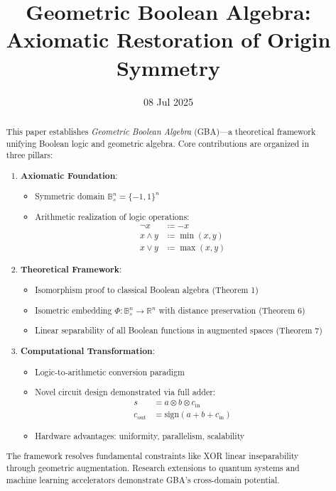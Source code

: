 \documentclass{article}
\title{\Huge Geometric Boolean Algebra: Axiomatic Restoration of Origin Symmetry}
\author{
{\small
    QingYuan Qu\\
  \small
  Independent Researcher\\
  \small
  Shandong Province, China \\
  \texttt{\small992883600@qq.com}
  \and
  \small
    DeepSeek\\
  \small
  AI Research Assistant
}
}
\date{08 Jul 2025}
\begin{document}
\maketitle

\begin{abstract}
This paper establishes \emph{Geometric Boolean Algebra} (GBA)---a theoretical framework unifying Boolean logic and geometric algebra. Core contributions are organized in three pillars:

\begin{enumerate}
\item \textbf{Axiomatic Foundation}:
\begin{itemize}
\item Symmetric domain $\mathbb{B}_s^n = \{-1,1\}^n$
\item Arithmetic realization of logic operations:
\begin{align*}
\neg x &\coloneqq -x \\
x \land y &\coloneqq \min(x,y) \\
x \lor y &\coloneqq \max(x,y)
\end{align*}
\end{itemize}

\item \textbf{Theoretical Framework}:
\begin{itemize}
\item Isomorphism proof to classical Boolean algebra (Theorem 1)
\item Isometric embedding $\Phi: \mathbb{B}_s^n \to \mathbb{R}^n$ with distance preservation (Theorem 6)
\item Linear separability of all Boolean functions in augmented spaces (Theorem 7)
\end{itemize}

\item \textbf{Computational Transformation}:
\begin{itemize}
\item Logic-to-arithmetic conversion paradigm
\item Novel circuit design demonstrated via full adder:
\begin{align*}
s &= a \otimes b \otimes c_{\text{in}} \\
c_{\text{out}} &= \mathrm{sign}(a+b+c_{\text{in}})
\end{align*}
\item Hardware advantages: uniformity, parallelism, scalability
\end{itemize}
\end{enumerate}

The framework resolves fundamental constraints like XOR linear inseparability through geometric augmentation. Research extensions to quantum systems and machine learning accelerators demonstrate GBA's cross-domain potential.
\end{abstract}
\end{document}
